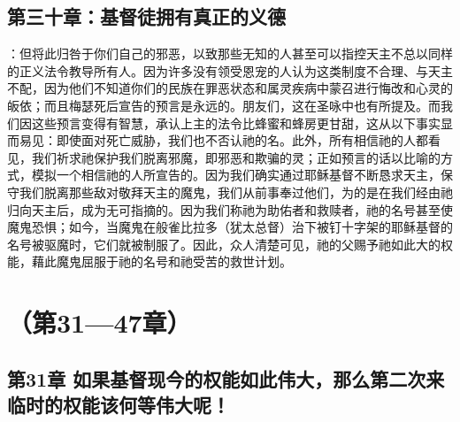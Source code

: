 
\subsection{第三十章：基督徒拥有真正的义德}

：但将此归咎于你们自己的邪恶，以致那些无知的人甚至可以指控天主不总以同样的正义法令教导所有人。因为许多没有领受恩宠的人认为这类制度不合理、与天主不配，因为他们不知道你们的民族在罪恶状态和属灵疾病中蒙召进行悔改和心灵的皈依；而且梅瑟死后宣告的预言是永远的。朋友们，这在圣咏中也有所提及。而我们因这些预言变得有智慧，承认上主的法令比蜂蜜和蜂房更甘甜，这从以下事实显而易见：即使面对死亡威胁，我们也不否认祂的名。此外，所有相信祂的人都看见，我们祈求祂保护我们脱离邪魔，即邪恶和欺骗的灵；正如预言的话以比喻的方式，模拟一个相信祂的人所宣告的。因为我们确实通过耶稣基督不断恳求天主，保守我们脱离那些敌对敬拜天主的魔鬼，我们从前事奉过他们，为的是在我们经由祂归向天主后，成为无可指摘的。因为我们称祂为助佑者和救赎者，祂的名号甚至使魔鬼恐惧；如今，当魔鬼在般雀比拉多（犹太总督）治下被钉十字架的耶稣基督的名号被驱魔时，它们就被制服了。因此，众人清楚可见，祂的父赐予祂如此大的权能，藉此魔鬼屈服于祂的名号和祂受苦的救世计划。\par



\section{（第31—47章）}


\subsection{第31章 如果基督现今的权能如此伟大，那么第二次来临时的权能该何等伟大呢！}

